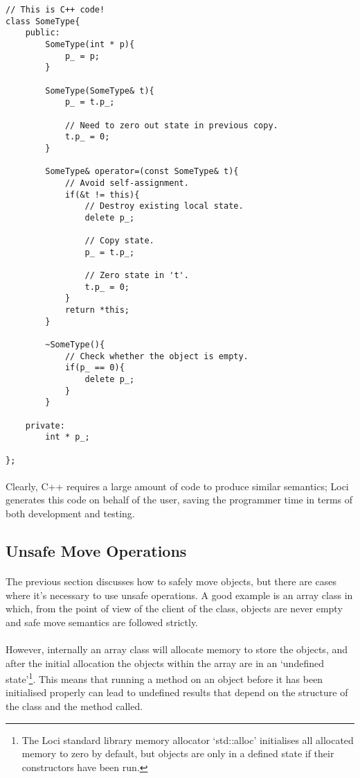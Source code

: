 \documentclass[12pt,twoside,notitlepage]{report}
\begin{document}
\begin{lstlisting}
// This is C++ code!
class SomeType{
	public:
		SomeType(int * p){
			p_ = p;
		}
		
		SomeType(SomeType& t){
			p_ = t.p_;
			
			// Need to zero out state in previous copy.
			t.p_ = 0;
		}
		
		SomeType& operator=(const SomeType& t){
			// Avoid self-assignment.
			if(&t != this){
				// Destroy existing local state.
				delete p_;
				
				// Copy state.
				p_ = t.p_;
				
				// Zero state in 't'.
				t.p_ = 0;
			}
			return *this;
		}
		
		~SomeType(){
			// Check whether the object is empty.
			if(p_ == 0){
				delete p_;
			}
		}
	
	private:
		int * p_;
	
};
\end{lstlisting}


\paragraph{}
Clearly, C++ requires a large amount of code to produce similar semantics; Loci generates this code on behalf of the user, saving the programmer time in terms of both development and testing.

\clearpage

\subsection{Unsafe Move Operations}

\paragraph{}
The previous section discusses how to safely move objects, but there are cases where it's necessary to use unsafe operations. A good example is an array class in which, from the point of view of the client of the class, objects are never empty and safe move semantics are followed strictly.

\paragraph{}
However, internally an array class will allocate memory to store the objects, and after the initial allocation the objects within the array are in an `undefined state'\footnote{The Loci standard library memory allocator `std::alloc' initialises all allocated memory to zero by default, but objects are only in a defined state if their constructors have been run.}. This means that running a method on an object before it has been initialised properly can lead to undefined results that depend on the structure of the class and the method called.
\end{document}
